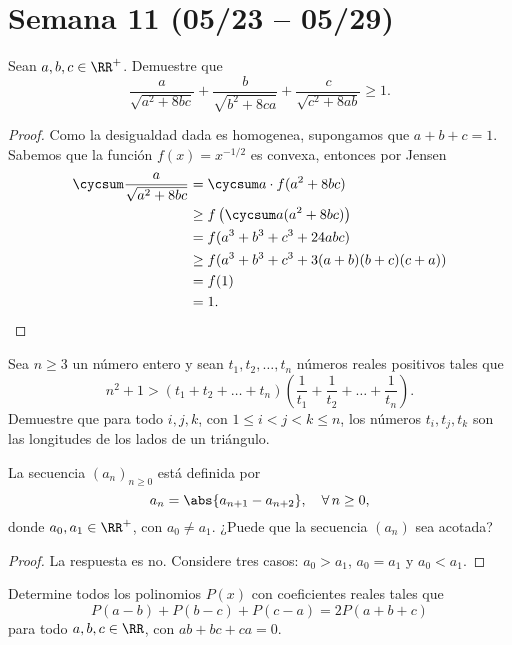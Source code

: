 \section{Semana 11 (05/23 -- 05/29)}


\begin{probEG}
  Sean $a,b,c\in\RR^+$. Demuestre que
  \[
    \frac{a}{\sqrt{a^2+8bc}}+\frac{b}{\sqrt{b^2+8ca}}+\frac{c}{\sqrt{c^2+8ab}}
    \ge 1.
  \]
\end{probEG}

\begin{proof}
  Como la desigualdad dada es homogenea, supongamos que $a+b+c=1$. Sabemos que
  la función $f(x)=x^{-1/2}$ es convexa, entonces por Jensen
  \begin{align*}
    \cycsum\frac{a}{\sqrt{a^2+8bc}}
    &= \cycsum a\cdot f(a^2+8bc) \\
    &\ge f\left(\cycsum a(a^2+8bc)\right) \\
    &= f(a^3+b^3+c^3+24abc) \\
    &\ge f(a^3+b^3+c^3+3(a+b)(b+c)(c+a)) \\
    &= f(1) \\
    &= 1.
  \end{align*}
\end{proof}

\begin{probEG}
  Sea $n\ge 3$ un número entero y sean $t_1,t_2,\dots,t_n$ números reales
  positivos tales que
  \[
    n^2+1
    >(t_1+t_2+\dots+t_n)\left(\frac{1}{t_1}+\frac{1}{t_2}+\dots+\frac{1}{t_n}\right).
  \]
  Demuestre que para todo $i,j,k$, con $1\le i<j<k\le n$, los números
  $t_i,t_j,t_k$ son las longitudes de los lados de un triángulo.
\end{probEG}

\begin{probEG}
  La secuencia $(a_n)_{n\ge 0}$ está definida por
  \[a_n=\abs{a_{n+1}-a_{n+2}},\quad\forall\,n\ge 0,\]
  donde $a_0,a_1\in\RR^+$, con $a_0\ne a_1$. ¿Puede que la secuencia $(a_n)$ sea
  acotada?
\end{probEG}

\begin{proof}
  La respuesta es no. Considere tres casos: $a_0>a_1$, $a_0=a_1$ y $a_0<a_1$.
\end{proof}

\begin{probMR}
  Determine todos los polinomios $P(x)$ con coeficientes reales tales que
  \[P(a-b)+P(b-c)+P(c-a)=2P(a+b+c)\]
  para todo $a,b,c\in\RR$, con $ab+bc+ca=0$.
\end{probMR}

